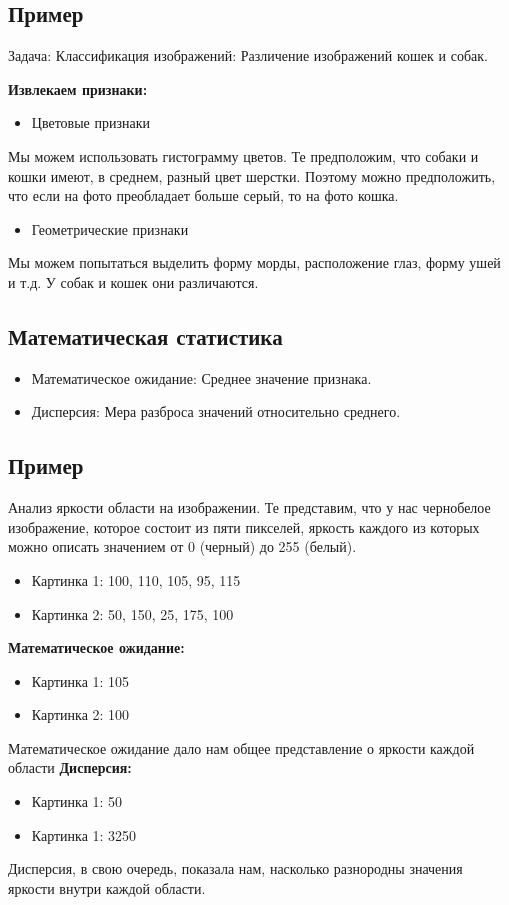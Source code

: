 \subsection*{Пример}
Задача: Классификация изображений: Различение изображений кошек и
собак.

\*

\textbf{Извлекаем признаки:}

\begin{itemize}
    \item Цветовые признаки
\end{itemize}
Мы можем использовать гистограмму цветов. Те предположим, что
собаки и кошки имеют, в среднем, разный цвет шерстки. Поэтому
можно предположить, что если на фото преобладает больше серый,
то на фото кошка.
\begin{itemize}
    \item Геометрические признаки
\end{itemize}
Мы можем попытаться выделить форму морды, расположение глаз,
форму ушей и т.д. У собак и кошек они различаются.

\newpage
\subsection{Математическая статистика}
\begin{itemize}
    \item Математическое ожидание: Среднее значение признака.
    \item Дисперсия: Мера разброса значений относительно среднего.
\end{itemize}
\subsection*{Пример}
Анализ яркости области на изображении. Те представим, что у нас чернобелое изображение, которое состоит из пяти пикселей, яркость каждого из
которых можно описать значением от 0 (черный) до 255 (белый).
\begin{itemize}
    \item Картинка 1: 100, 110, 105, 95, 115
    \item Картинка 2: 50, 150, 25, 175, 100
\end{itemize}
\textbf{Математическое ожидание:}
\begin{itemize}
    \item Картинка 1: 105
    \item Картинка 2: 100
\end{itemize}
Математическое ожидание дало нам общее представление о яркости
каждой области
\textbf{Дисперсия:}
\begin{itemize}
    \item Картинка 1: 50
    \item Картинка 1: 3250
\end{itemize}
Дисперсия, в свою очередь, показала нам, насколько разнородны значения яркости внутри каждой области.

